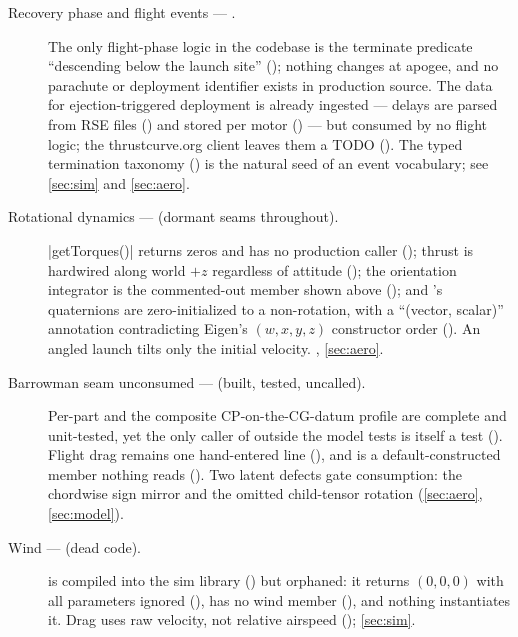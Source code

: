 \begin{description}

  \item[Recovery phase and flight events --- \fabsent.] The only flight-phase logic in the
  codebase is the terminate predicate ``descending below the launch site''
  (); nothing changes at apogee, and no parachute or deployment
  identifier exists in production source. The data for ejection-triggered deployment is already
  ingested --- delays are parsed from RSE files () and stored
  per motor () --- but consumed by no flight logic; the
  thrustcurve.org client leaves them a TODO (). The typed
  termination taxonomy () is the natural seed of an event vocabulary;
  see \cref{sec:sim} and \cref{sec:aero}.

  \item[Rotational dynamics --- \fabsent{} (dormant seams throughout).]
  \cppinline|getTorques()| returns zeros and has no production caller
  (); thrust is hardwired along world $+z$ regardless of attitude
  (); the orientation integrator is the commented-out member shown
  above (); and 's quaternions are zero-initialized to
  a non-rotation, with a ``(vector, scalar)'' annotation contradicting Eigen's $(w,x,y,z)$
  constructor order (). An angled launch tilts only the initial velocity.
  , \cref{sec:aero}.

  \item[Barrowman seam unconsumed --- \fpartial{} (built, tested, uncalled).] Per-part
   and the composite CP-on-the-CG-datum profile are complete and unit-tested, yet
  the only caller of  outside the model tests is itself a test
  (). Flight drag remains one hand-entered line
  (), and  is a default-constructed
  member nothing reads (). Two latent defects gate consumption: the
   chordwise sign mirror and the omitted child-tensor rotation (\cref{sec:aero},
  \cref{sec:model}).

  \item[Wind --- \fabsent{} (dead code).]  is compiled into the sim library
  () but orphaned: it returns $(0,0,0)$ with all parameters ignored
  (),  has no wind member
  (), and nothing instantiates it. Drag uses raw velocity, not
  relative airspeed (); \cref{sec:sim}.


\end{description}

